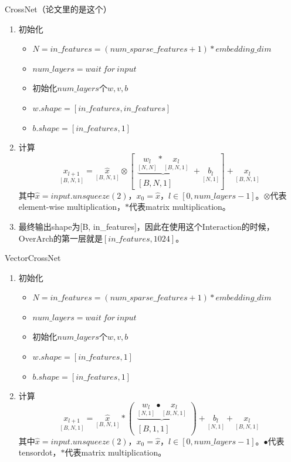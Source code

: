 \documentclass{article}
\begin{document}
CrossNet（论文里的是这个）
\begin{enumerate}
    \item 初始化
    \begin{itemize}
        \item $N=in\_features = (num\_sparse\_features + 1) * embedding\_dim$
        \item $num\_layers=wait\ for\ input$
        \item 初始化$num\_layers$个$w,v,b$
        \item $w.shape = [in\_features, in\_features]$
        \item $b.shape = [in\_features, 1]$
    \end{itemize}
    \item 计算 
    $$
    \underset{[B,N,1]}{x_{l+1}}=
    \underset{[B,N,1]}{\hat{x}}\otimes
    \left[
        \begin{matrix}
            \underbrace{
                \underset{[N,N]}{w_l} \ast \underset{[B,N,1]}{x_l}
            } \\ [B,N,1] 
        \end{matrix} + \underset{[N,1]}{b_l}
    \right]
    +\underset{[B,N,1]}{x_l}
    $$其中$\hat{x}=input.unsqueeze(2)$，$x_0 = \hat{x}$，$l\in[0,num\_layers-1]$。$\otimes$代表element-wise multiplication，$\ast$代表matrix multiplication。
    \item 最终输出shape为[B, in\_features]，因此在使用这个Interaction的时候，OverArch的第一层就是$[in\_features, 1024]$。
\end{enumerate}
VectorCrossNet
\begin{enumerate}
    \item 初始化
    \begin{itemize}
        \item $N=in\_features = (num\_sparse\_features + 1) * embedding\_dim$
        \item $num\_layers=wait\ for\ input$
        \item 初始化$num\_layers$个$w,v,b$
        \item $w.shape = [in\_features, 1]$
        \item $b.shape = [in\_features, 1]$
    \end{itemize}
    \item 计算 
    $$
    \underset{[B,N,1]}{x_{l+1}}=
    \underset{[B,N,1]}{\hat{x}}\ast
    \left(
        \begin{matrix}
            \underbrace{
                \underset{[N,1]}{w_l} \bullet \underset{[B,N,1]}{x_l}
            } \\ [B,1,1] 
        \end{matrix} 
    \right)
    + \underset{[N,1]}{b_l} + \underset{[B,N,1]}{x_l}
    $$其中$\hat{x}=input.unsqueeze(2)$，$x_0 = \hat{x}$，$l\in[0,num\_layers-1]$。$\bullet$代表tensordot，$\ast$代表matrix multiplication。
\end{enumerate}
\end{document}
